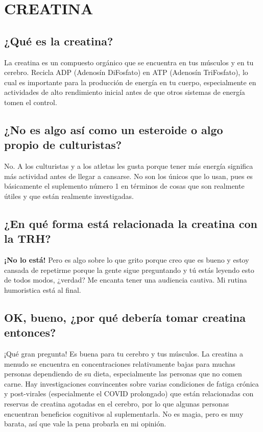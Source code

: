 \documentclass{article}
\begin{document}
\section{CREATINA}

\subsection{¿Qué es la creatina?}

La creatina es un compuesto orgánico que se encuentra en tus músculos y en tu cerebro. Recicla ADP (Adenosín DiFosfato) en ATP (Adenosín TriFosfato), lo cual es importante para la producción de energía en tu cuerpo, especialmente en actividades de alto rendimiento inicial antes de que otros sistemas de energía tomen el control.

\subsection{¿No es algo así como un esteroide o algo propio de culturistas?}

No. A los culturistas y a los atletas les gusta porque tener más energía significa más actividad antes de llegar a cansarse. No son los únicos que lo usan, pues es básicamente el suplemento número 1 en términos de cosas que son realmente útiles y que están realmente investigadas.

\subsection{¿En qué forma está relacionada la creatina con la TRH?}

\textbf{¡No lo está!} Pero es algo sobre lo que grito porque creo que es bueno y estoy cansada de repetirme porque la gente sigue preguntando y tú estás leyendo esto de todos modos, ¿verdad? Me encanta tener una audiencia cautiva. Mi rutina humoristica está al final.

\subsection{OK, bueno, ¿por qué debería tomar creatina entonces?}

¡Qué gran pregunta! Es buena para tu cerebro y tus músculos. La creatina a menudo se encuentra en concentraciones relativamente bajas para muchas personas dependiendo de su dieta, especialmente las personas que no comen carne. Hay investigaciones convincentes sobre varias condiciones de fatiga crónica y post-virales (especialmente el COVID prolongado) que están relacionadas con reservas de creatina agotadas en el cerebro, por lo que algunas personas encuentran beneficios cognitivos al suplementarla. No es magia, pero es muy barata, así que vale la pena probarla en mi opinión.
\end{document}
